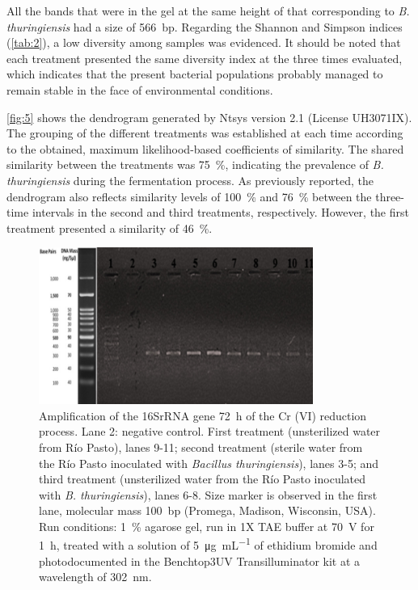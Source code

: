 \documentclass{univsciauth}
\begin{document}
All the bands that were in the gel at the same height of that
corresponding to \emph{B. thuringiensis} had a size of \SI{566}{bp}.
Regarding the Shannon and Simpson indices (\autoref{tab:2}), a low
diversity among samples was evidenced. It should be noted that each
treatment presented the same diversity index at the three times
evaluated, which indicates that the present bacterial populations
probably managed to remain stable in the face of environmental
conditions.

\autoref{fig:5} shows the dendrogram generated by Ntsys version 2.1
(License UH3071IX). The grouping of the different treatments was
established at each time according to the obtained, maximum
likelihood-based coefficients of similarity. The shared similarity
between the treatments was \SI{75}{\%}, indicating the prevalence of \emph{B.
thuringiensis} during the fermentation process. As previously reported,
the dendrogram also reflects similarity levels of \SI{100}{\%} and \SI{76}{\%}
between the three-time intervals in the second and third treatments,
respectively. However, the first treatment presented a similarity of
\SI{46}{\%}.
\begin{figure}[t!]
        \centering
        \includegraphics[width=0.8\textwidth]{figures/Figure2.jpg}
        \caption{
                Amplification of the 16SrRNA gene \SI{72}{h} of the
                Cr (VI) reduction process. Lane 2: negative control. First
                treatment (unsterilized water from Río Pasto), lanes 9-11;
                second treatment (sterile water from the Río Pasto inoculated
                with \emph{Bacillus thuringiensis}), lanes 3-5; and third
                treatment (unsterilized water from the Río Pasto inoculated
                with \emph{B. thuringiensis}), lanes 6-8. Size marker is
                observed in the first lane, molecular mass \SI{100}{bp} (Promega,
                Madison, Wisconsin, USA). Run conditions: \SI{1}{\%} agarose gel, run
                in 1X TAE buffer at \SI{70}{V} for \SI{1}{h}, treated with a solution
                of \SI{5}{\micro g.mL^{-1}} of ethidium bromide and photodocumented in the
                Benchtop3UV Transilluminator kit at a wavelength of \SI{302}{nm}.
        }
        \label{fig:2}
\end{figure}
\end{document}
